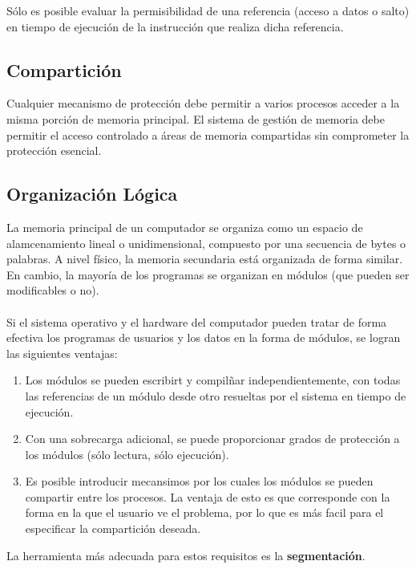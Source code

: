 \documentclass[12pt, a4paper]{article}
\begin{document}
\begin{tcolorbox}[colback=cyan!10, colframe=blue!70, title=Nota]
    Sólo es posible evaluar la permisibilidad de una referencia (acceso a datos o salto) en tiempo de ejecución de la instrucción que realiza dicha referencia.
\end{tcolorbox}
\subsection{Compartición}
Cualquier mecanismo de protección debe permitir a varios procesos acceder a la misma porción de memoria principal. El sistema de gestión de memoria debe permitir el acceso controlado a áreas de memoria compartidas sin comprometer la protección esencial.
\subsection{Organización Lógica}
La memoria principal de un computador se organiza como un espacio de alamcenamiento lineal o unidimensional, compuesto por una secuencia de bytes o palabras. A nivel físico, la memoria secundaria está organizada de forma similar. En cambio, la mayoría de los programas se organizan en módulos (que pueden ser modificables o no).\\\\ 
Si el sistema operativo y el hardware del computador pueden tratar de forma efectiva los programas de usuarios y los datos en la forma de módulos, se logran las siguientes ventajas:
\begin{enumerate}
    \item Los módulos se pueden escribirt y compilñar independientemente, con todas las referencias de un módulo desde otro resueltas por el sistema en tiempo de ejecución.
    \item Con una sobrecarga adicional, se puede proporcionar grados de protección a los módulos (sólo lectura, sólo ejecución).
    \item Es posible introducir mecansimos por los cuales los módulos se pueden compartir entre los procesos. La ventaja de esto es que corresponde con la forma en la que el usuario ve el problema, por lo que es más facil para el especificar la compartición deseada.
\end{enumerate}
\begin{tcolorbox}[colback=cyan!10, colframe=blue!70, title=Nota]
    La herramienta más adecuada para estos requisitos es la \textbf{segmentación}.
\end{tcolorbox}
\end{document}
